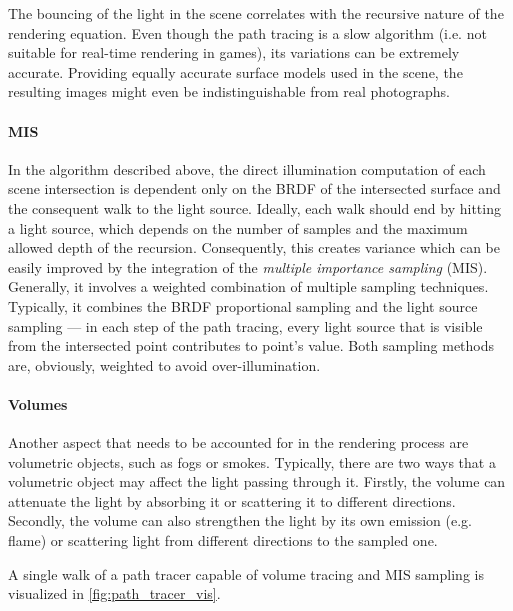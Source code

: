 The bouncing of the light in the scene correlates with the recursive nature of the rendering equation. Even though the path tracing is a slow algorithm (i.e. not suitable for real-time rendering in games), its variations can be extremely accurate. Providing equally accurate surface models used in the scene, the resulting images might even be indistinguishable from real photographs. 


\paragraph{MIS}

In the algorithm described above, the direct illumination computation of each scene intersection is dependent only on the BRDF of the intersected surface and the consequent walk to the light source. Ideally, each walk should end by hitting a light source, which depends on the number of samples and the maximum allowed depth of the recursion. Consequently, this creates variance which can be easily improved by the integration of the \emph{multiple importance sampling} (MIS). Generally, it involves a weighted combination of multiple sampling techniques. Typically, it combines the BRDF proportional sampling and the light source sampling --- in each step of the path tracing, every light source that is visible from the intersected point contributes to point's value. Both sampling methods are, obviously, weighted to avoid over-illumination. 

\paragraph{Volumes}

Another aspect that needs to be accounted for in the rendering process are volumetric objects, such as fogs or smokes. Typically, there are two ways that a volumetric object may affect the light passing through it. Firstly, the volume can attenuate the light by absorbing it or scattering it to different directions. Secondly, the volume can also strengthen the light by its own emission (e.g. flame) or scattering light from different directions to the sampled one.

A single walk of a path tracer capable of volume tracing and MIS sampling is visualized in \autoref{fig:path_tracer_vis}.

